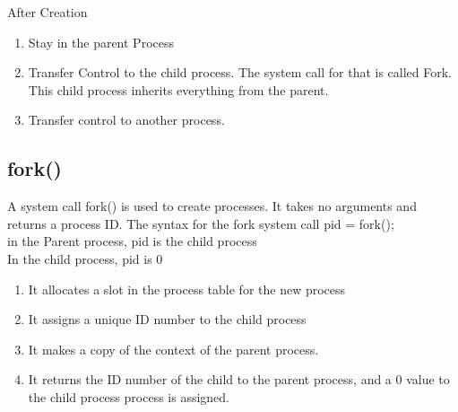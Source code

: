 \documentclass[11pt]{article}
\begin{document}
After Creation
\begin{enumerate}
    \item Stay in the parent Process
    \item Transfer Control to the child process. The system call for that is called Fork. This child process inherits everything from the parent. 
    \item Transfer control to another process. 
\end{enumerate}


\subsection{fork()}
A system call fork() is used to create processes. It takes no arguments and returns a process ID. 
The syntax for the fork system call
pid = fork();\\
in the Parent process, pid is the child process\\
In the child process, pid is 0

\begin{enumerate}
    \item It allocates a slot in the process table for the new process
    \item It assigns a unique ID number to the child process
    \item It makes a copy of the context of the parent process. 
    \item It returns the ID number of the child to the parent process, and a 0 value to the child process process is assigned. 
\end{enumerate}
\end{document}
